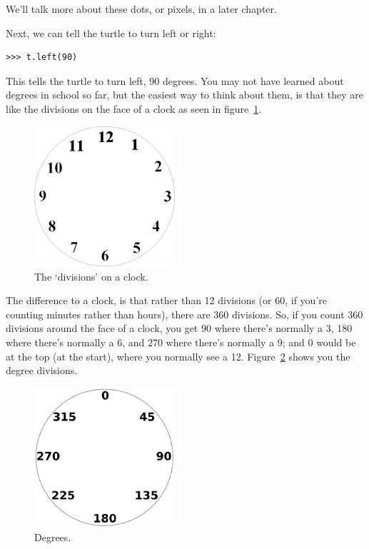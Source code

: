 We'll talk more about these dots, or pixels, in a later chapter.

Next, we can tell the turtle to turn left or right:

\begin{listing}
\begin{verbatim}
>>> t.left(90)
\end{verbatim}
\end{listing}

This tells the turtle to turn left, 90 degrees.  You may not have learned about degrees in school so far, but the easiest way to think about them, is that they are like the divisions on the face of a clock as seen in figure~\ref{fig13}.

\begin{figure}
\begin{center}
\includegraphics[width=52mm]{figure13.eps}
\end{center}
\caption{The `divisions' on a clock.}\label{fig13}
\end{figure}

The difference to a clock, is that rather than 12 divisions (or 60, if you're counting minutes rather than hours), there are 360 divisions.  So, if you count 360 divisions around the face of a clock, you get 90 where there's normally a 3, 180 where there's normally a 6, and 270 where there's normally a 9; and 0 would be at the top (at the start), where you normally see a 12.  Figure~\ref{fig14} shows you the degree divisions.

\begin{figure}
\begin{center}
\includegraphics[width=52mm]{figure14.eps}
\end{center}
\caption{Degrees.}\label{fig14}
\end{figure}

